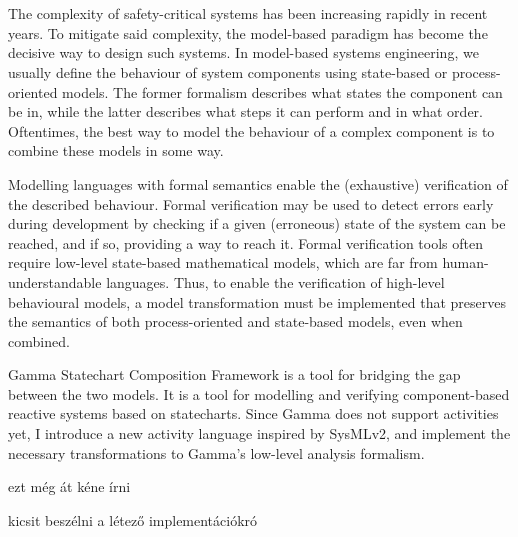\chapter{\bevezetes}

The complexity of safety-critical systems has been increasing rapidly in recent years. To mitigate said complexity, the model-based paradigm has become the decisive way to design such systems. In model-based systems engineering, we usually define the behaviour of system components using state-based or process-oriented models. The former formalism describes what states the component can be in, while the latter describes what steps it can perform and in what order. Oftentimes, the best way to model the behaviour of a complex component is to combine these models in some way. 

Modelling languages with formal semantics enable the (exhaustive) verification of the described behaviour. Formal verification may be used to detect errors early during development by checking if a given (erroneous) state of the system can be reached, and if so, providing a way to reach it. Formal verification tools often require low-level state-based mathematical models, which are far from human-understandable languages. Thus, to enable the verification of high-level behavioural models, a model transformation must be implemented that preserves the semantics of both process-oriented and state-based models, even when combined.  

Gamma Statechart Composition Framework is a tool for bridging the gap between the two models. It is a tool for modelling and verifying component-based reactive systems based on statecharts. Since Gamma does not support activities yet, I introduce a new activity language inspired by SysMLv2, and implement the necessary transformations to Gamma’s low-level analysis formalism.

ezt még át kéne írni

kicsit beszélni a létező implementációkró
